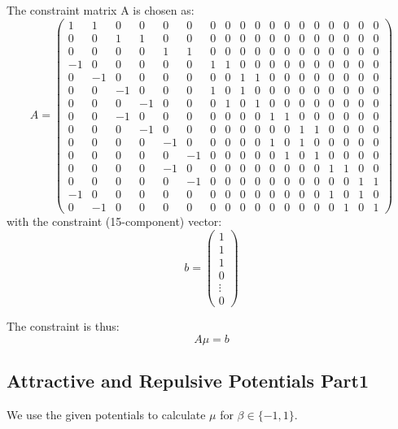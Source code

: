 \documentclass[12pt,a4paper]{scrartcl}
\begin{document}
The constraint matrix A is chosen as:
\begin{equation}
   A =
   \begin{pmatrix}
   1 & 1 & 0 & 0 & 0 & 0 & 0 & 0 & 0 & 0 & 0 & 0 & 0 & 0 & 0 & 0 & 0 & 0 \\
   0 & 0 & 1 & 1 & 0 & 0 & 0 & 0 & 0 & 0 & 0 & 0 & 0 & 0 & 0 & 0 & 0 & 0 \\
   0 & 0 & 0 & 0 & 1 & 1 & 0 & 0 & 0 & 0 & 0 & 0 & 0 & 0 & 0 & 0 & 0 & 0 \\
   -1 & 0 & 0 & 0 & 0 & 0 & 1 & 1 & 0 & 0 & 0 & 0 & 0 & 0 & 0 & 0 & 0 & 0 \\
   0 & -1 & 0 & 0 & 0 & 0 & 0 & 0 & 1 & 1 & 0 & 0 & 0 & 0 & 0 & 0 & 0 & 0 \\
   0 & 0 & -1 & 0 & 0 & 0 & 1 & 0 & 1 & 0 & 0 & 0 & 0 & 0 & 0 & 0 & 0 & 0 \\
   0 & 0 & 0 & -1 & 0 & 0 & 0 & 1 & 0 & 1 & 0 & 0 & 0 & 0 & 0 & 0 & 0 & 0 \\
   0 & 0 & -1 & 0 & 0 & 0 & 0 & 0 & 0 & 0 & 1 & 1 & 0 & 0 & 0 & 0 & 0 & 0 \\
   0 & 0 & 0 & -1 & 0 & 0 & 0 & 0 & 0 & 0 & 0 & 0 & 1 & 1 & 0 & 0 & 0 & 0 \\
   0 & 0 & 0 & 0 & -1 & 0 & 0 & 0 & 0 & 0 & 1 & 0 & 1 & 0 & 0 & 0 & 0 & 0 \\
   0 & 0 & 0 & 0 & 0 & -1 & 0 & 0 & 0 & 0 & 0 & 1 & 0 & 1 & 0 & 0 & 0 & 0 \\
   0 & 0 & 0 & 0 & -1 & 0 & 0 & 0 & 0 & 0 & 0 & 0 & 0 & 0 & 1 & 1 & 0 & 0 \\
   0 & 0 & 0 & 0 & 0 & -1 & 0 & 0 & 0 & 0 & 0 & 0 & 0 & 0 & 0 & 0 & 1 & 1 \\
   -1 & 0 & 0 & 0 & 0 & 0 & 0 & 0 & 0 & 0 & 0 & 0 & 0 & 0 & 1 & 0 & 1 & 0 \\
   0 & -1 & 0 & 0 & 0 & 0 & 0 & 0 & 0 & 0 & 0 & 0 & 0 & 0 & 0 & 1 & 0 & 1
   \end{pmatrix}
\end{equation}
with the constraint (15-component) vector:
\[
  b = 
  \begin{pmatrix}
    1 \\
    1 \\
    1 \\
    0 \\
    \vdots \\
    0
  \end{pmatrix}
\]

The constraint is thus:
\[
  A \mu = b
\]


\subsection{Attractive and Repulsive Potentials Part1}
We use the given potentials to calculate $\mu$ for $\beta \in \{-1,1\}$.
\end{document}
